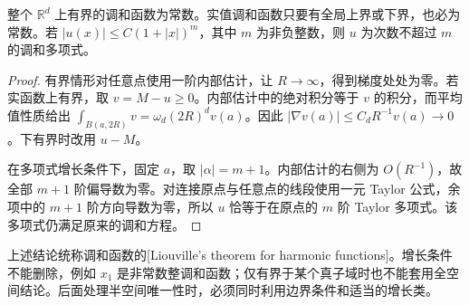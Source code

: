 \begin{theorem}[Liouville]\label{b2:thm:13-liouville}
整个 \(\mathbb R^d\) 上有界的调和函数为常数。实值调和函数只要有全局上界或下界，也必为常数。若 \(|u(x)|\leq C(1+|x|)^m\)，其中 \(m\) 为非负整数，则 \(u\) 为次数不超过 \(m\) 的调和多项式。
\end{theorem}
\begin{proof}
有界情形对任意点使用一阶内部估计，让 \(R\to\infty\)，得到梯度处处为零。若实函数上有界，取 \(v=M-u\geq0\)。内部估计中的绝对积分等于 \(v\) 的积分，而平均值性质给出 \(\int_{B(a,2R)}v=\omega_d(2R)^dv(a)\)。因此 \(|\nabla v(a)|\leq C_dR^{-1}v(a)\to0\)。下有界时改用 \(u-M\)。

在多项式增长条件下，固定 \(a\)，取 \(|\alpha|=m+1\)。内部估计的右侧为 \(O(R^{-1})\)，故全部 \(m+1\) 阶偏导数为零。对连接原点与任意点的线段使用一元 Taylor 公式，余项中的 \(m+1\) 阶方向导数为零，所以 \(u\) 恰等于在原点的 \(m\) 阶 Taylor 多项式。该多项式仍满足原来的调和方程。
\end{proof}

上述结论统称调和函数的[Liouville's theorem for harmonic functions]。增长条件不能删除，例如 \(x_1\) 是非常数整调和函数；仅有界于某个真子域时也不能套用全空间结论。后面处理半空间唯一性时，必须同时利用边界条件和适当的增长类。
